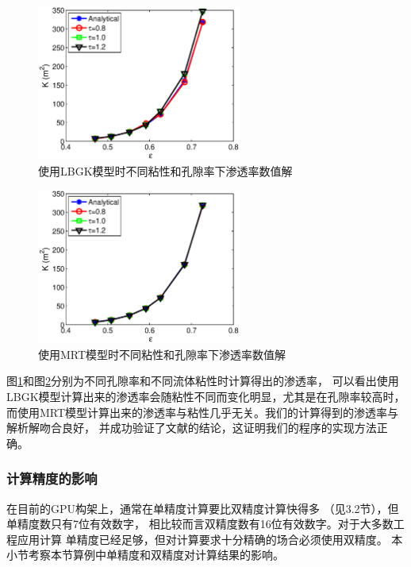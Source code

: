 \begin{figure}[htb]
  \centering
  \includegraphics[width=0.6\textwidth]{img/k_bgk}
  \caption{使用LBGK模型时不同粘性和孔隙率下渗透率数值解}
  \label{fig:suckbgk}
\end{figure}

\begin{figure}[htb]
  \centering
  \includegraphics[width=0.6\textwidth]{img/k_mrt}
  \caption{使用MRT模型时不同粘性和孔隙率下渗透率数值解}
  \label{fig:suckmrt}
\end{figure}

图\ref{fig:suckbgk}和图\ref{fig:suckmrt}分别为不同孔隙率和不同流体粘性时计算得出的渗透率，
可以看出使用LBGK模型计算出来的渗透率会随粘性不同而变化明显，尤其是在孔隙率较高时，
而使用MRT模型计算出来的渗透率与粘性几乎无关。我们的计算得到的渗透率与解析解吻合良好，
并成功验证了文献\cite{pan2006evaluation}的结论，这证明我们的程序的实现方法正确。

\subsubsection{计算精度的影响}
在目前的GPU构架上，通常在单精度计算要比双精度计算快得多
（见3.2节），但单精度数只有7位有效数字，
相比较而言双精度数有16位有效数字。对于大多数工程应用计算
单精度已经足够，但对计算要求十分精确的场合必须使用双精度。
本小节考察本节算例中单精度和双精度对计算结果的影响。

